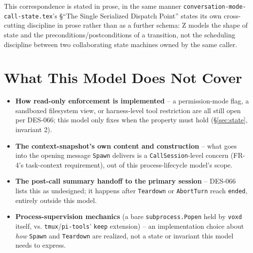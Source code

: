 \documentclass[a4paper,10pt,fleqn]{article}
\begin{document}
This correspondence is stated in prose, in the same manner
\texttt{conversation-mode-call-state.tex}'s \S``The Single Serialized
Dispatch Point'' states its own cross-cutting discipline in prose rather than
as a further schema: Z models the shape of state and the
preconditions/postconditions of a transition, not the scheduling discipline
between two collaborating state machines owned by the same caller.

\section{What This Model Does Not Cover}

\begin{itemize}
  \item \textbf{How read-only enforcement is implemented} -- a permission-mode
    flag, a sandboxed filesystem view, or harness-level tool restriction are
    all still open per DES-066; this model only fixes when the property must
    hold (\S\ref{sec:state}, invariant 2).
  \item \textbf{The context-snapshot's own content and construction} -- what
    goes into the opening message \texttt{Spawn} delivers is a
    \texttt{CallSession}-level concern (FR-4's task-context requirement),
    out of this process-lifecycle model's scope.
  \item \textbf{The post-call summary handoff to the primary session} -- DES-066
    lists this as undesigned; it happens after \texttt{Teardown} or
    \texttt{AbortTurn} reach \texttt{ended}, entirely outside this model.
  \item \textbf{Process-supervision mechanics} (a bare \texttt{subprocess.Popen}
    held by \texttt{voxd} itself, vs. \texttt{tmux}/\texttt{pi-tools}' \texttt{keep}
    extension) -- an implementation choice about \emph{how} \texttt{Spawn} and
    \texttt{Teardown} are realized, not a state or invariant this model needs
    to express.
\end{itemize}
\end{document}
